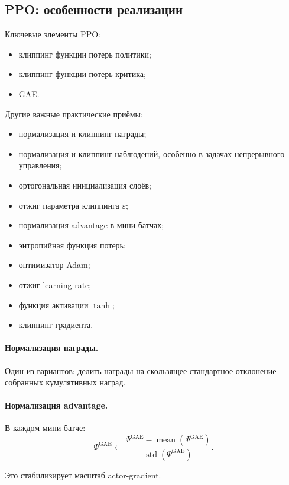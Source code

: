 \documentclass[12pt,a4paper]{article}
\begin{document}
\subsection{PPO: особенности реализации}

Ключевые элементы PPO:

\begin{itemize}
    \item клиппинг функции потерь политики;
    \item клиппинг функции потерь критика;
    \item GAE.
\end{itemize}

Другие важные практические приёмы:

\begin{itemize}
    \item нормализация и клиппинг награды;
    \item нормализация и клиппинг наблюдений, особенно в задачах непрерывного управления;
    \item ортогональная инициализация слоёв;
    \item отжиг параметра клиппинга $\varepsilon$;
    \item нормализация advantage в мини-батчах;
    \item энтропийная функция потерь;
    \item оптимизатор Adam;
    \item отжиг learning rate;
    \item функция активации $\tanh$;
    \item клиппинг градиента.
\end{itemize}

\paragraph{Нормализация награды.}

Один из вариантов: делить награды на скользящее стандартное отклонение собранных кумулятивных наград.

\paragraph{Нормализация advantage.}

В каждом мини-батче:
\[
\Psi^{\mathrm{GAE}}
\leftarrow
\frac{
\Psi^{\mathrm{GAE}}
-
\operatorname{mean}(\Psi^{\mathrm{GAE}})
}{
\operatorname{std}(\Psi^{\mathrm{GAE}})
}.
\]

Это стабилизирует масштаб actor-gradient.
\end{document}
